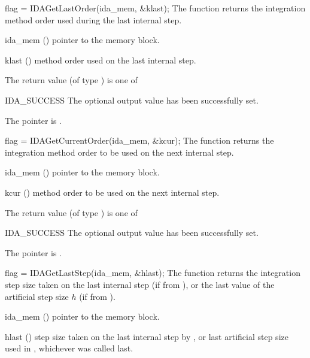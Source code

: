 {{}
{}
{
  flag = IDAGetLastOrder(ida\_mem, \&klast);
}
{
  The function  returns the
  integration method order used during the last internal step.
}
{
  \begin{args}
  \item[ida\_mem] ()
    pointer to the {\ida} memory block.
  \item[klast] ()
    method order used on the last internal step.
  \end{args}
}
{
  The return value  (of type ) is one of
  \begin{args}
  \item[IDA\_SUCCESS]
    The optional output value has been successfully set.
  \item[\Id{IDA\_MEM\_NULL}]
    The  pointer is .
  \end{args}
}
{}
{
  flag = IDAGetCurrentOrder(ida\_mem, \&kcur);
}
{
  The function  returns the
  integration method order to be used on the next internal step.
}
{
  \begin{args}
  \item[ida\_mem] ()
    pointer to the {\ida} memory block.
  \item[kcur] ()
    method order to be used on the next internal step.
  \end{args}
}
{
  The return value  (of type ) is one of
  \begin{args}
  \item[IDA\_SUCCESS]
    The optional output value has been successfully set.
  \item[\Id{IDA\_MEM\_NULL}]
    The  pointer is .
  \end{args}
}
{}
{
  flag = IDAGetLastStep(ida\_mem, \&hlast);
}
{
  The function  returns the
  integration step size taken on the last internal step (if from ),
  or the last value of the artificial step size $h$ (if from ).
}
{
  \begin{args}
  \item[ida\_mem] ()
    pointer to the {\ida} memory block.
  \item[hlast] ()
    step size taken on the last internal step by {\ida}, or last artificial
    step size used in , whichever was called last.

\end{args}}}
